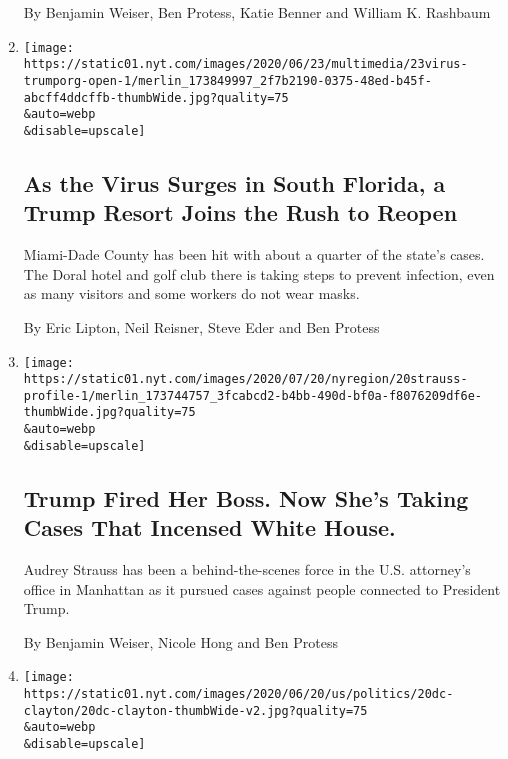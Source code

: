 \begin{enumerate}
  By Benjamin Weiser, Ben Protess, Katie Benner and William K. Rashbaum
\item
  \href{/2020/06/23/us/trump-doral-reopen-coronavirus.html}{}

  \texttt{[image: https://static01.nyt.com/images/2020/06/23/multimedia/23virus-trumporg-open-1/merlin\_173849997\_2f7b2190-0375-48ed-b45f-abcff4ddcffb-thumbWide.jpg?quality=75\\\&auto=webp\\\&disable=upscale]}

  \hypertarget{as-the-virus-surges-in-south-florida-a-trump-resort-joins-the-rush-to-reopen}{%
  \subsection{As the Virus Surges in South Florida, a Trump Resort Joins
  the Rush to
  Reopen}\label{as-the-virus-surges-in-south-florida-a-trump-resort-joins-the-rush-to-reopen}}

  Miami-Dade County has been hit with about a quarter of the state's
  cases. The Doral hotel and golf club there is taking steps to prevent
  infection, even as many visitors and some workers do not wear masks.

  By Eric Lipton, Neil Reisner, Steve Eder and Ben Protess
\item
  \href{/2020/06/21/nyregion/us-attorney-trump-audrey-strauss.html}{}

  \texttt{[image: https://static01.nyt.com/images/2020/07/20/nyregion/20strauss-profile-1/merlin\_173744757\_3fcabcd2-b4bb-490d-bf0a-f8076209df6e-thumbWide.jpg?quality=75\\\&auto=webp\\\&disable=upscale]}

  \hypertarget{trump-fired-her-boss-now-shes-taking-cases-that-incensed-white-house}{%
  \subsection{Trump Fired Her Boss. Now She's Taking Cases That Incensed
  White
  House.}\label{trump-fired-her-boss-now-shes-taking-cases-that-incensed-white-house}}

  Audrey Strauss has been a behind-the-scenes force in the U.S.
  attorney's office in Manhattan as it pursued cases against people
  connected to President Trump.

  By Benjamin Weiser, Nicole Hong and Ben Protess
\item
  \href{/2020/06/20/business/jay-clayton-sdny-sec.html}{}

  \texttt{[image: https://static01.nyt.com/images/2020/06/20/us/politics/20dc-clayton/20dc-clayton-thumbWide-v2.jpg?quality=75\\\&auto=webp\\\&disable=upscale]}


\end{enumerate}
